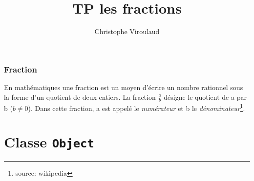 \documentclass[svgnames,11pt]{beamer}
\author[]{Christophe Viroulaud}
\title{TP les fractions}
\date{\framebox{\textbf{Lang 03}}}
\institute{Terminale - NSI}
\begin{document}
\begin{frame}
    \titlepage
\end{frame}
\begin{frame}
    \frametitle{Fraction}

    En mathématiques une fraction est un moyen d'écrire un nombre rationnel sous la forme d'un quotient de deux entiers. La fraction $\frac{a}{b}$ désigne le quotient de a par b ($b\neq0$). Dans cette fraction, a est appelé le \emph{numérateur} et b le \emph{dénominateur}\footnote{source: wikipedia}.
\end{frame}
\begin{frame}
    \frametitle{}


\end{frame}
\section{Classe \textbf{\texttt{Object}}}
\end{document}
